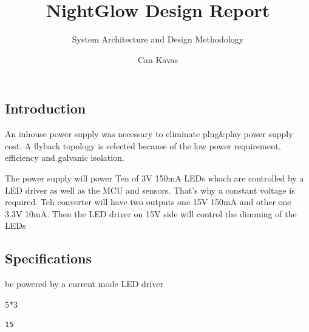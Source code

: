 \documentclass[
  letterpaper,
  DIV=11,
  numbers=noendperiod]{scrartcl}
\title{NightGlow Design Report}
\subtitle{System Architecture and Design Methodology}
\author{Can Kavas}
\date{}
\newenvironment{Shaded}{\begin{snugshade}}{\end{snugshade}}
\newcommand{\DecValTok}[1]{\textcolor[rgb]{0.68,0.00,0.00}{#1}}
\newcommand{\OperatorTok}[1]{\textcolor[rgb]{0.37,0.37,0.37}{#1}}
\renewcommand*\contentsname{Table of contents}
\newcommand\contentsname{Table of contents}
\begin{document}
\maketitle

\renewcommand*\contentsname{Index}
{
\hypersetup{linkcolor=}
\setcounter{tocdepth}{3}
\tableofcontents
}

\subsection{Introduction}\label{introduction}

An inhouse power supply was necessary to eliminate plug\&play power
supply cost. A flyback topology is selected because of the low power
requirement, efficiency and galvanic isolation.

The power supply will power Ten of 3V 150mA LEDs whach are controlled by
a LED driver as well as the MCU and sensors. That's why a constant
voltage is required. Teh converter will have two outputs one 15V 150mA
and other one 3.3V 10mA. Then the LED driver on 15V side will control
the dimming of the LEDs

\subsection{Specifications}\label{specifications}

be powered by a current mode LED driver

\begin{Shaded}
\begin{Highlighting}[]
\DecValTok{5}\OperatorTok{*}\DecValTok{3}
\end{Highlighting}
\end{Shaded}

\begin{verbatim}
15
\end{verbatim}
\end{document}

